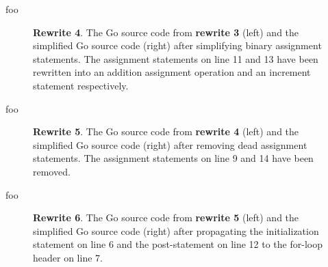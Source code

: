 foo

\begin{figure}[htbp]
	\centering
	\begin{subfigure}[t]{0.45\textwidth}
		
	\end{subfigure}
	\qquad
	\begin{subfigure}[t]{0.45\textwidth}
		
	\end{subfigure}
	\caption{\textbf{Rewrite 4}. The Go source code from \textbf{rewrite 3} (left) and the simplified Go source code (right) after simplifying binary assignment statements. The assignment statements on line 11 and 13 have been rewritten into an addition assignment operation and an increment statement respectively.}
	\label{fig:rewrite_4}
\end{figure}

foo

\begin{figure}[htbp]
	\centering
	\begin{subfigure}[t]{0.45\textwidth}
		
	\end{subfigure}
	\qquad
	\begin{subfigure}[t]{0.45\textwidth}
		
	\end{subfigure}
	\caption{\textbf{Rewrite 5}. The Go source code from \textbf{rewrite 4} (left) and the simplified Go source code (right) after removing dead assignment statements. The assignment statements on line 9 and 14 have been removed.}
	\label{fig:rewrite_5}
\end{figure}

foo

\begin{figure}[htbp]
	\centering
	\begin{subfigure}[t]{0.45\textwidth}
		
	\end{subfigure}
	\qquad
	\begin{subfigure}[t]{0.45\textwidth}
		
	\end{subfigure}
	\caption{\textbf{Rewrite 6}. The Go source code from \textbf{rewrite 5} (left) and the simplified Go source code (right) after propagating the initialization statement on line 6 and the post-statement on line 12 to the for-loop header on line 7.}
	\label{fig:rewrite_6}
\end{figure}
